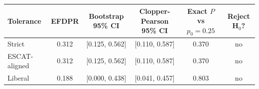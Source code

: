 \begin{tabular}{lccccc}\toprule
Tolerance & EFDPR & Bootstrap 95\% CI & Clopper-Pearson 95\% CI & Exact $P$ vs $p_0=0.25$ & Reject H$_0$? \\ \midrule
Strict & 0.312 & [0.125, 0.562] & [0.110, 0.587] & 0.370 & no \\
ESCAT-aligned & 0.312 & [0.125, 0.562] & [0.110, 0.587] & 0.370 & no \\
Liberal & 0.188 & [0.000, 0.438] & [0.041, 0.457] & 0.803 & no \\
\bottomrule\end{tabular}
